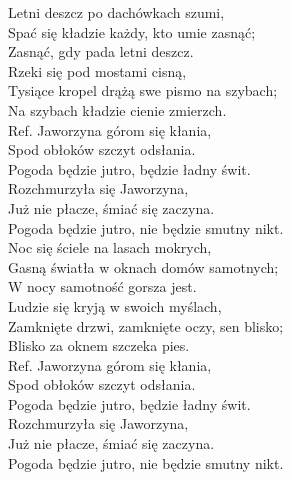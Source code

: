 
Letni deszcz po dachówkach szumi, \\
Spać się kładzie każdy, kto umie zasnąć; \\
Zasnąć, gdy pada letni deszcz. \tab{}\\
Rzeki się pod mostami cisną, \tab{}\\
Tysiące kropel drążą swe pismo na szybach; \\
Na szybach kładzie cienie zmierzch. \\
\hops
Ref. Jaworzyna górom się kłania, \tab{}\\
 Spod obłoków szczyt odsłania. \tab{}\\
 Pogoda będzie jutro, będzie ładny świt. \tab{}\\
 Rozchmurzyła się Jaworzyna, \tab{}\\
 Już nie płacze, śmiać się zaczyna. \tab{}\\
 Pogoda będzie jutro, nie będzie smutny nikt. \\
\hops
Noc się ściele na lasach mokrych, \\
Gasną światła w oknach domów samotnych; \\
W nocy samotność gorsza jest. \\
Ludzie się kryją w swoich myślach, \\
Zamknięte drzwi, zamknięte oczy, sen blisko; \\
Blisko za oknem szczeka pies. \\
\hops
Ref. Jaworzyna górom się kłania, \\
 Spod obłoków szczyt odsłania. \\
 Pogoda będzie jutro, będzie ładny świt. \\
 Rozchmurzyła się Jaworzyna, \\
 Już nie płacze, śmiać się zaczyna. \\
 Pogoda będzie jutro, nie będzie smutny nikt.
